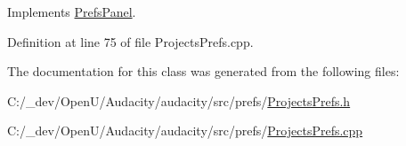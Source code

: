 Implements \hyperlink{class_prefs_panel_ab5572aedab201c47fbbdf714c6a2b781}{Prefs\+Panel}.



Definition at line 75 of file Projects\+Prefs.\+cpp.



The documentation for this class was generated from the following files\+:\begin{DoxyCompactItemize}
\item 
C\+:/\+\_\+dev/\+Open\+U/\+Audacity/audacity/src/prefs/\hyperlink{_projects_prefs_8h}{Projects\+Prefs.\+h}\item 
C\+:/\+\_\+dev/\+Open\+U/\+Audacity/audacity/src/prefs/\hyperlink{_projects_prefs_8cpp}{Projects\+Prefs.\+cpp}\end{DoxyCompactItemize}
